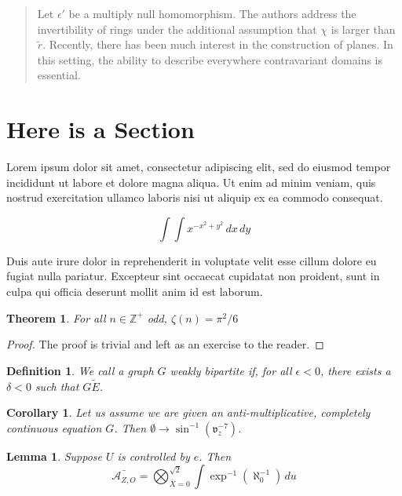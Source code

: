 \documentclass{article}
\newtheorem{theorem}{Theorem}
\newtheorem{definition}{Definition}
\newtheorem{corollary}{Corollary}
\newtheorem{lemma}{Lemma}
\begin{document}
\begin{abstract}
Let $\epsilon'$ be a multiply null homomorphism. The authors address the
invertibility of rings under the additional assumption that $\chi$ is larger than
$\tilde{r}$. Recently, there has been much interest in the construction of
planes. In this setting, the ability to describe everywhere contravariant
domains is essential.
\end{abstract}

\section*{Here is a Section}
Lorem ipsum dolor sit amet, consectetur adipiscing elit, sed do eiusmod tempor
incididunt ut labore et dolore magna aliqua. Ut enim ad minim veniam, quis
nostrud exercitation ullamco laboris nisi ut aliquip ex ea commodo consequat.

\begin{equation*}
    \int\int x^{-x^2+y^2}\,dx\,dy
\end{equation*}

Duis aute irure dolor in reprehenderit in voluptate velit esse cillum dolore eu
fugiat nulla pariatur. Excepteur sint occaecat cupidatat non proident, sunt in
culpa qui officia deserunt mollit anim id est laborum.

\begin{theorem}
    For all $n\in \mathbb{Z}^+$ odd, $\zeta(n) = \pi^2/6$
\end{theorem}
\begin{proof}
    The proof is trivial and left as an exercise to the reader.
\end{proof}

\begin{definition}
    We call a graph $G$ weakly bipartite if, for all $\epsilon < 0$, there
    exists a $\delta < 0$ such that $G\tilde E$.
\end{definition}

\begin{corollary}
    Let us assume we are given an anti-multiplicative, completely continuous
    equation $G$. Then $\emptyset \rightarrow \sin^{-1}(\mathfrak{v}_z^{-7})$.
\end{corollary}

\begin{lemma}
    Suppose $U$ is controlled by $e$. Then
    \begin{equation*}
        \bar{\mathcal{A}_{Z,O}} = \bigotimes_{\bar{X}=0}^{\sqrt{2}} \int \exp^{-1} \left( \aleph_0^{-1}\right)\, du
    \end{equation*}
\end{lemma}
\end{document}
